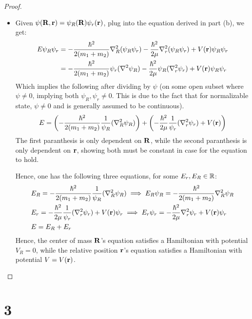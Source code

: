 \documentclass{article}
\begin{document}
\begin{proof}
\begin{itemize}
        \hfil

        \item[(c)] Given $\psi(\mathbf{R},\mathbf{r}) =\psi_R(\mathbf{R})\psi_r(\mathbf{r})$, plug into the equation derived in part (b), we get:
        \begin{align}
            E\psi_R \psi_r &= -\frac{\hbar^2}{2(m_1+m_2)}\nabla_R^2(\psi_R\psi_r) - \frac{\hbar^2}{2\mu}\nabla_r^2(\psi_R\psi_r) + V(\mathbf{r})\psi_R\psi_r\\
            &= -\frac{\hbar^2}{2(m_1+m_2)}\psi_r (\nabla^2\psi_R) - \frac{\hbar^2}{2\mu}\psi_R(\nabla_r^2\psi_r) + V(\mathbf{r})\psi_R\psi_r
        \end{align}
        Which implies the following after dividing by $\psi$ (on some open subset where $\psi\neq 0$, implying both $\psi_R,\psi_r\neq 0$. This is due to the fact that for normalizable state, $\psi\neq 0$ and is generally assumed to be continuous).
        \begin{align}
            E = \left(-\frac{\hbar^2}{2(m_1+m_2)}\frac{1}{\psi_R}(\nabla_R^2\psi_R)\right) + \left(-\frac{\hbar^2}{2\mu}\frac{1}{\psi_r}(\nabla_r^2\psi_r) + V(\mathbf{r})\right)
        \end{align}
        The first paranthesis is only dependent on $\mathbf{R}$, while the second paranthesis is only dependent on $\mathbf{r}$, showing both must be constant in case for the equation to hold.

        Hence, one has the following three equations, for some $E_r,E_R\in\mathbb{R}$:
        \begin{align}
            &E_R = -\frac{\hbar^2}{2(m_1+m_2)}\frac{1}{\psi_R}(\nabla^2_R\psi_R) \implies E_R\psi_R = -\frac{\hbar^2}{2(m_1+m_2)}\nabla_R^2\psi_R\\
            &E_r = -\frac{\hbar^2}{2\mu}\frac{1}{\psi_r}(\nabla_r^2\psi_r) + V(\mathbf{r})\psi_r \implies E_r\psi_r = -\frac{\hbar^2}{2\mu}\nabla_r^2\psi_r + V(\mathbf{r})\psi_r\\
            & E = E_R+E_r
        \end{align}
        Hence, the center of mass $\mathbf{R}$'s equation satisfies a Hamiltonian with potential $V_R=0$, while the relative position $\mathbf{r}$'s equation satisfies a Hamiltonian with potential $V = V(\mathbf{r})$.
    \end{itemize}
\end{proof}

\newpage

\section*{3}
\end{document}

